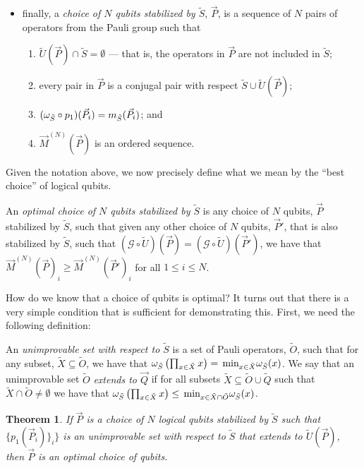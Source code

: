\documentclass[twocolumn,showpacs,preprintnumbers,amsmath,amssymb,nofootinbib,pra,floatfix]{revtex4-1}
\newtheorem{theorem}{Theorem}
\newenvironment{definition}[1][Definition]{\begin{trivlist}
\item[\hskip \labelsep {\bfseries #1}]}{\end{trivlist}}
\newcommand{\lst}{\vec}
\newcommand{\set}{\tilde}
\newcommand{\genfun}{\mathcal{G}}
\begin{document}
\begin{definition}
\begin{itemize}
\item finally, a \emph{choice of $N$ qubits stabilized by $\set S$}, $\lst P$, is a sequence of $N$ pairs of operators from the Pauli group such that 
\begin{enumerate}
\item $\set U(\lst P)\cap \set S = \emptyset$ --- that is, the operators in $\lst P$ are not included in $\set S$;
\item every pair in $\lst P$ is a conjugal pair with respect $\set S \cup \set U(\lst P)$;
\item $(\om_{\set S}\circ p_1)(\lst P_i)=m_{\set S}(\lst P_i)$; and
\item $\lst M^{(N)}(\lst P)$ is an ordered sequence.
\end{enumerate}
\end{itemize}

\end{definition}
Given the notation above, we now precisely define what we mean by the ``best choice'' of logical qubits.

\begin{definition}
An \emph{optimal choice of $N$ qubits stabilized by $\set S$} is any choice of $N$ qubits, $\lst P$ stabilized by $\set S$, such that given any other choice of $N$ qubits, $\lst P'$, that is also stabilized by $\set S$, such that $(\genfun\circ \set U)(\lst P)=(\genfun\circ \set U)(\lst P')$, we have that $\lst M^{(N)}(\lst P)_i \ge \lst M^{(N)}(\lst P')_i$ for all $1\le i \le N$.
\end{definition}
How do we know that a choice of qubits is optimal?  It turns out that there is a very simple condition that is sufficient for demonstrating this.  First, we need the following definition:

\begin{definition}
An \emph{unimprovable set with respect to $\set S$} is a set of Pauli operators, $\set O$, such that for any subset, $\set X\subseteq \set O$, we have that $\om_{\set S}\paren{\prod_{x\in \set X} x} = \min_{x\in\set X}\om_{\set S}(x)$.  We say that an unimprovable set $\set O$ \emph{extends to $\lst Q$} if for all subsets $\set X \subseteq \set O\cup\set Q$ such that $\set X\cap \set O \ne \emptyset$ we have that $\om_{\set S}\paren{\prod_{x\in \set X} x} \le \min_{x\in\set X\cap \set O}\om_{\set S}(x)$.
\end{definition}
\begin{theorem}
\label{optimality-condition}
If $\lst P$ is a choice of $N$ logical qubits stabilized by $\set S$ such that $\{p_1(\lst P_i)\}_i\}$ is an unimprovable set with respect to $\set S$ that extends to $\set U(\lst P)$, then $\lst P$ is an optimal choice of qubits.
\end{theorem}
\end{document}
